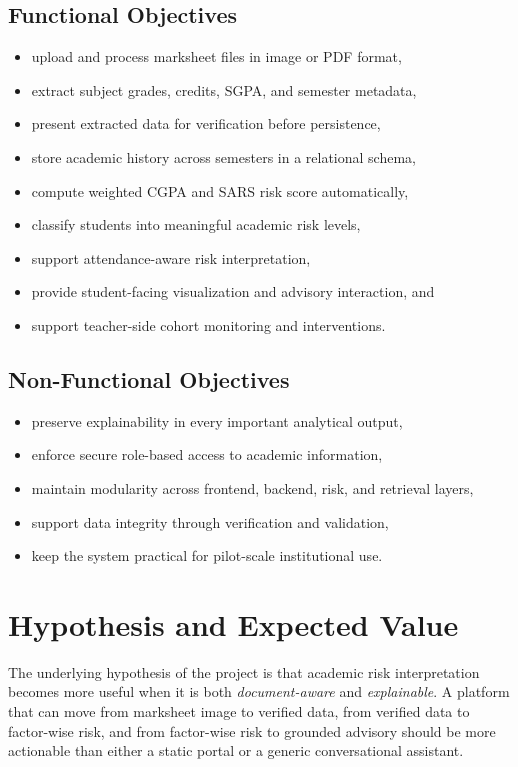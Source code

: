 \subsection{Functional Objectives}
\begin{itemize}[leftmargin=*]
\item upload and process marksheet files in image or PDF format,
\item extract subject grades, credits, SGPA, and semester metadata,
\item present extracted data for verification before persistence,
\item store academic history across semesters in a relational schema,
\item compute weighted CGPA and SARS risk score automatically,
\item classify students into meaningful academic risk levels,
\item support attendance-aware risk interpretation,
\item provide student-facing visualization and advisory interaction, and
\item support teacher-side cohort monitoring and interventions.
\end{itemize}

\subsection{Non-Functional Objectives}
\begin{itemize}[leftmargin=*]
\item preserve explainability in every important analytical output,
\item enforce secure role-based access to academic information,
\item maintain modularity across frontend, backend, risk, and retrieval layers,
\item support data integrity through verification and validation,
\item keep the system practical for pilot-scale institutional use.
\end{itemize}

\section{Hypothesis and Expected Value}
The underlying hypothesis of the project is that academic risk interpretation becomes more useful when it is both \emph{document-aware} and \emph{explainable}. A platform that can move from marksheet image to verified data, from verified data to factor-wise risk, and from factor-wise risk to grounded advisory should be more actionable than either a static portal or a generic conversational assistant.

